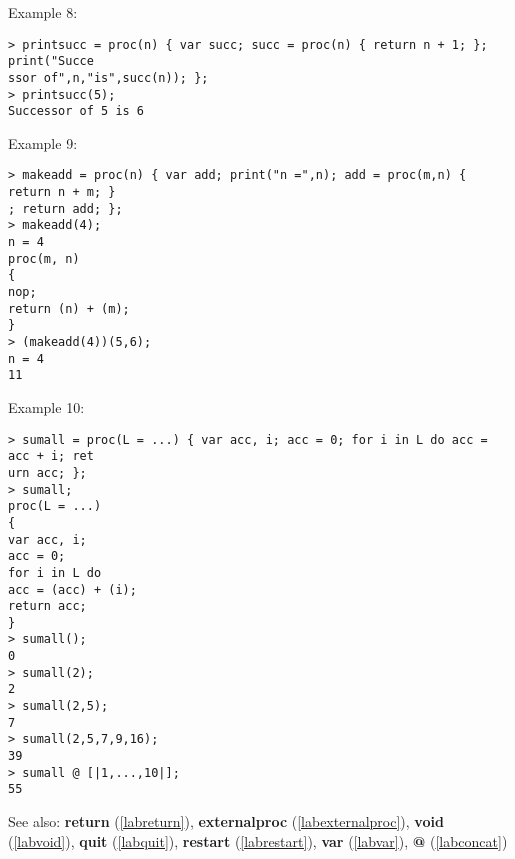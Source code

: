\noindent Example 8: 
\begin{center}\begin{minipage}{15cm}\begin{Verbatim}[frame=single]
> printsucc = proc(n) { var succ; succ = proc(n) { return n + 1; }; print("Succe
ssor of",n,"is",succ(n)); };
> printsucc(5);
Successor of 5 is 6
\end{Verbatim}
\end{minipage}\end{center}
\noindent Example 9: 
\begin{center}\begin{minipage}{15cm}\begin{Verbatim}[frame=single]
> makeadd = proc(n) { var add; print("n =",n); add = proc(m,n) { return n + m; }
; return add; };
> makeadd(4);
n = 4
proc(m, n)
{
nop;
return (n) + (m);
}
> (makeadd(4))(5,6);
n = 4
11
\end{Verbatim}
\end{minipage}\end{center}
\noindent Example 10: 
\begin{center}\begin{minipage}{15cm}\begin{Verbatim}[frame=single]
> sumall = proc(L = ...) { var acc, i; acc = 0; for i in L do acc = acc + i; ret
urn acc; };
> sumall;
proc(L = ...)
{
var acc, i;
acc = 0;
for i in L do
acc = (acc) + (i);
return acc;
}
> sumall();
0
> sumall(2);
2
> sumall(2,5);
7
> sumall(2,5,7,9,16);
39
> sumall @ [|1,...,10|];
55
\end{Verbatim}
\end{minipage}\end{center}
See also: \textbf{return} (\ref{labreturn}), \textbf{externalproc} (\ref{labexternalproc}), \textbf{void} (\ref{labvoid}), \textbf{quit} (\ref{labquit}), \textbf{restart} (\ref{labrestart}), \textbf{var} (\ref{labvar}), \textbf{@} (\ref{labconcat})
